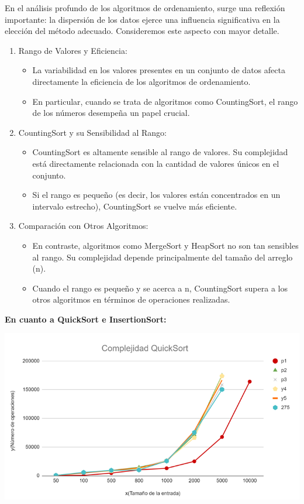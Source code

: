 \documentclass[12pt]{article}
\begin{document}
En el análisis profundo de los algoritmos de ordenamiento, surge una reflexión importante: la dispersión de los datos ejerce una influencia significativa en la elección del método adecuado. Consideremos este aspecto con mayor detalle.
\par\vspace{0.4cm}
\begin{enumerate}
    \item Rango de Valores y Eficiencia:
          \begin{itemize}
              \item La variabilidad en los valores presentes en un conjunto de datos afecta directamente la eficiencia de los algoritmos de ordenamiento.
              \item En particular, cuando se trata de algoritmos como CountingSort, el rango de los números desempeña un papel crucial.
          \end{itemize}
    \item CountingSort y su Sensibilidad al Rango:
          \begin{itemize}
              \item CountingSort es altamente sensible al rango de valores. Su complejidad está directamente relacionada con la cantidad de valores únicos en el conjunto.
              \item Si el rango es pequeño (es decir, los valores están concentrados en un intervalo estrecho), CountingSort se vuelve más eficiente.
          \end{itemize}
    \item Comparación con Otros Algoritmos:
          \begin{itemize}
              \item En contraste, algoritmos como MergeSort y HeapSort no son tan sensibles al rango. Su complejidad depende principalmente del tamaño del arreglo (n).
              \item Cuando el rango es pequeño y se acerca a n, CountingSort supera a los otros algoritmos en términos de operaciones realizadas.
          \end{itemize}
\end{enumerate}
\par\vspace{0.4cm}
\textbf{En cuanto a QuickSort e InsertionSort:}
\par\vspace{0.4cm}
\includegraphics[width=15cm]{Images/Graf_QS.png}
\end{document}
